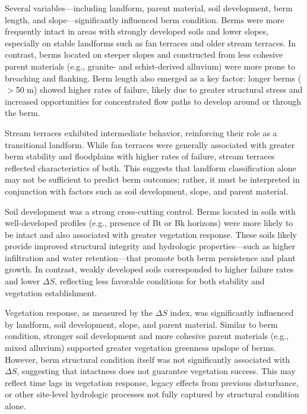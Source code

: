 \documentclass[review]{elsarticle}
\begin{document}
Several variables—including landform, parent material, soil development, berm length, and slope—significantly influenced berm condition. Berms were more frequently intact in areas with strongly developed soils and lower slopes, especially on stable landforms such as fan terraces and older stream terraces. In contrast, berms located on steeper slopes and constructed from less cohesive parent materials (e.g., granite- and schist-derived alluvium) were more prone to breaching and flanking. Berm length also emerged as a key factor: longer berms ($>$50 m) showed higher rates of failure, likely due to greater structural stress and increased opportunities for concentrated flow paths to develop around or through the berm.

Stream terraces exhibited intermediate behavior, reinforcing their role as a transitional landform. While fan terraces were generally associated with greater berm stability and floodplains with higher rates of failure, stream terraces reflected characteristics of both. This suggests that landform classification alone may not be sufficient to predict berm outcomes; rather, it must be interpreted in conjunction with factors such as soil development, slope, and parent material.

Soil development was a strong cross-cutting control. Berms located in soils with well-developed profiles (e.g., presence of Bt or Bk horizons) were more likely to be intact and also associated with greater vegetation response. These soils likely provide improved structural integrity and hydrologic properties—such as higher infiltration and water retention—that promote both berm persistence and plant growth. In contrast, weakly developed soils corresponded to higher failure rates and lower $\Delta S$, reflecting less favorable conditions for both stability and vegetation establishment.

Vegetation response, as measured by the $\Delta S$ index, was significantly influenced by landform, soil development, slope, and parent material. Similar to berm condition, stronger soil development and more cohesive parent materials (e.g., mixed alluvium) supported greater vegetation greenness upslope of berms. However, berm structural condition itself was not significantly associated with $\Delta S$, suggesting that intactness does not guarantee vegetation success. This may reflect time lags in vegetation response, legacy effects from previous disturbance, or other site-level hydrologic processes not fully captured by structural condition alone.
\end{document}
